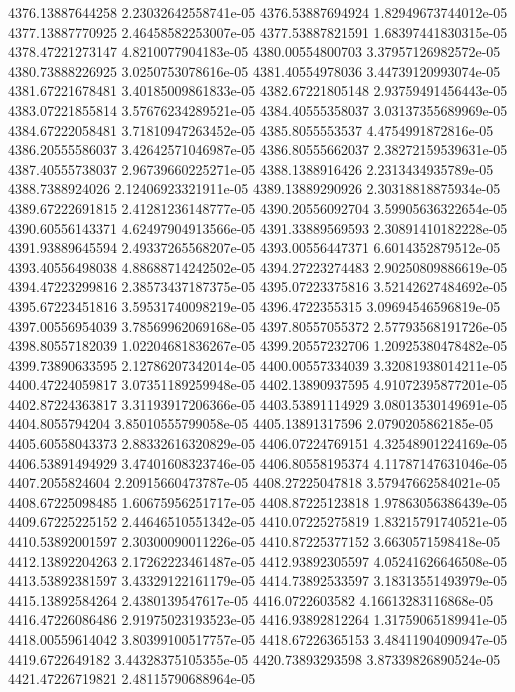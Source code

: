 {4376.13887644258 2.23032642558741e-05
4376.53887694924 1.82949673744012e-05
4377.13887770925 2.46458582253007e-05
4377.53887821591 1.68397441830315e-05
4378.47221273147 4.8210077904183e-05
4380.00554800703 3.37957126982572e-05
4380.73888226925 3.0250753078616e-05
4381.40554978036 3.44739120993074e-05
4381.67221678481 3.40185009861833e-05
4382.67221805148 2.93759491456443e-05
4383.07221855814 3.57676234289521e-05
4384.40555358037 3.03137355689969e-05
4384.67222058481 3.71810947263452e-05
4385.8055553537 4.4754991872816e-05
4386.20555586037 3.42642571046987e-05
4386.80555662037 2.38272159539631e-05
4387.40555738037 2.96739660225271e-05
4388.1388916426 2.2313434935789e-05
4388.7388924026 2.12406923321911e-05
4389.13889290926 2.30318818875934e-05
4389.67222691815 2.41281236148777e-05
4390.20556092704 3.59905636322654e-05
4390.60556143371 4.62497904913566e-05
4391.33889569593 2.30891410182228e-05
4391.93889645594 2.49337265568207e-05
4393.00556447371 6.6014352879512e-05
4393.40556498038 4.88688714242502e-05
4394.27223274483 2.90250809886619e-05
4394.47223299816 2.38573437187375e-05
4395.07223375816 3.52142627484692e-05
4395.67223451816 3.59531740098219e-05
4396.4722355315 3.09694546596819e-05
4397.00556954039 3.78569962069168e-05
4397.80557055372 2.57793568191726e-05
4398.80557182039 1.02204681836267e-05
4399.20557232706 1.20925380478482e-05
4399.73890633595 2.12786207342014e-05
4400.00557334039 3.32081938014211e-05
4400.47224059817 3.07351189259948e-05
4402.13890937595 4.91072395877201e-05
4402.87224363817 3.31193917206366e-05
4403.53891114929 3.08013530149691e-05
4404.8055794204 3.85010555799058e-05
4405.13891317596 2.0790205862185e-05
4405.60558043373 2.88332616320829e-05
4406.07224769151 4.32548901224169e-05
4406.53891494929 3.47401608323746e-05
4406.80558195374 4.11787147631046e-05
4407.2055824604 2.20915660473787e-05
4408.27225047818 3.57947662584021e-05
4408.67225098485 1.60675956251717e-05
4408.87225123818 1.97863056386439e-05
4409.67225225152 2.44646510551342e-05
4410.07225275819 1.83215791740521e-05
4410.53892001597 2.30300090011226e-05
4410.87225377152 3.6630571598418e-05
4412.13892204263 2.17262223461487e-05
4412.93892305597 4.05241626646508e-05
4413.53892381597 3.43329122161179e-05
4414.73892533597 3.18313551493979e-05
4415.13892584264 2.4380139547617e-05
4416.0722603582 4.16613283116868e-05
4416.47226086486 2.91975023193523e-05
4416.93892812264 1.31759065189941e-05
4418.00559614042 3.80399100517757e-05
4418.67226365153 3.48411904090947e-05
4419.6722649182 3.44328375105355e-05
4420.73893293598 3.87339826890524e-05
4421.47226719821 2.48115790688964e-05
}
